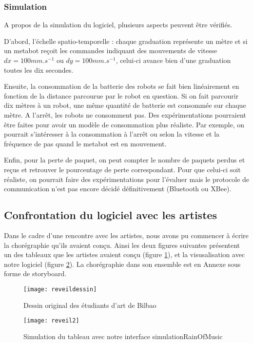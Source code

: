 \subsubsection{Simulation}

A propos de la simulation du logiciel, plusieurs aspects peuvent être vérifiés.

D'abord, l'échelle spatio-temporelle : chaque graduation représente un mètre et si un metabot reçoit les commandes indiquant des mouvements de vitesse $dx=100 mm.s^{-1}$ ou $dy=100 mm.s^{-1}$, celui-ci avance bien d'une graduation toutes les dix secondes.

Ensuite, la consommation de la batterie des robots se fait bien linéairement en fonction de la distance parcourue par le robot en question. Si on fait parcourir dix mètres à un robot, une même quantité de batterie est consommée sur chaque mètre. A l'arrêt, les robots ne consomment pas. Des expérimentations pourraient être faites pour avoir un modèle de consommation plus réaliste. Par exemple, on pourrait s'intéresser à la consommation à l'arrêt ou selon la vitesse et la fréquence de pas quand le metabot est en mouvement.

Enfin, pour la perte de paquet, on peut compter le nombre de paquets perdus et reçus et retrouver le pourcentage de perte correspondant. Pour que celui-ci soit réaliste, on pourrait faire des expérimentations pour l'évaluer mais le protocole de communication n'est pas encore décidé définitivement (Bluetooth ou XBee). 

\subsection{Confrontation du logiciel avec les artistes}

Dans le cadre d'une rencontre avec les artistes, nous avons pu commencer à écrire la chorégraphie qu'ils avaient conçu. Ainsi les deux figures suivantes présentent un des tableaux que les artistes avaient conçu (figure \ref{chore}), et la visusalisation avec notre logiciel (figure \ref{reveil}). La chorégraphie dans son ensemble est en Annexe sous forme de storyboard. 


\begin{figure}[H]
\centering
\texttt{[image: reveildessin]}
\caption{Dessin original des étudiants d'art de Bilbao}
\label{chore}
\end{figure}


\begin{figure} [H]
\centering
\texttt{[image: reveil2]}
\caption{Simulation du tableau avec notre interface simulationRainOfMusic}
\label{reveil}
\end{figure}

